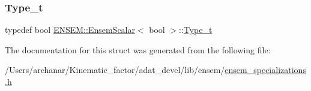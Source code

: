 \subsubsection{\texorpdfstring{Type\_t}{Type\_t}\hspace{0.1cm}{\footnotesize\ttfamily [2/2]}}
{\footnotesize\ttfamily typedef bool \mbox{\hyperlink{structENSEM_1_1EnsemScalar}{E\+N\+S\+E\+M\+::\+Ensem\+Scalar}}$<$ bool $>$\+::\mbox{\hyperlink{structENSEM_1_1EnsemScalar_3_01bool_01_4_a577829e3cf981727768117428436ac89}{Type\+\_\+t}}}



The documentation for this struct was generated from the following file\+:\begin{DoxyCompactItemize}
\item 
/\+Users/archanar/\+Kinematic\+\_\+factor/adat\+\_\+devel/lib/ensem/\mbox{\hyperlink{lib_2ensem_2ensem__specializations_8h}{ensem\+\_\+specializations.\+h}}\end{DoxyCompactItemize}

